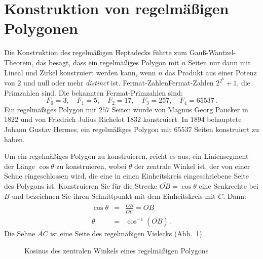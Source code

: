 \section{Konstruktion von regelmäßigen Polygonen}\label{s.hept-regular}

Die Konstruktion des regelmäßigen Heptadecks führte zum Gauß-Wantzel-Theorem, das besagt, dass ein regelmäßiges Polygon mit $n$ Seiten nur dann mit Lineal und Zirkel konstruiert werden kann, wenn $n$ das Produkt aus einer Potenz von $2$ und null oder mehr \emph{distinct} ist. Fermat-Zahlen{Fermat-Zahlen} $2^{2^k}+1$, die Primzahlen sind. Die bekannten Fermat-Primzahlen sind:
\[
F_0=3,\quad F_1=5,\quad F_2=17,\quad F_3=257,\quad F_4=65537\,.
\]
Ein regelmäßiges Polygon mit $257$ Seiten wurde von Magnus Georg Paucker in $1822$ und von Friedrich Julius Richelot $1832$ konstruiert. In $1894$ behauptete Johann Gustav Hermes, ein regelmäßiges Polygon mit $65537$ Seiten konstruiert zu haben.

Um ein regelmäßiges Polygon zu konstruieren, reicht es aus, ein Liniensegment der Länge $\cos \theta$ zu konstruieren, wobei $\theta$ der zentrale Winkel ist, der von einer Sehne eingeschlossen wird, die eine in einen Einheitskreis eingeschriebene Seite des Polygons ist. Konstruieren Sie für die Strecke $\overline{OB}=\cos\theta$ eine Senkrechte bei $B$ und bezeichnen Sie ihren Schnittpunkt mit dem Einheitskreis mit $C$. Dann:
\begin{eqnarray*}
\cos \theta&=&\displaystyle\frac{\overline{OB}}{\overline{OC}}=\overline{OB}\\
\theta &=& \cos^{-1} (\overline{OB})\,.
\end{eqnarray*}
Die Sehne $\overline{AC}$ ist eine Seite des regelmäßigen Vielecks (Abb.~\ref{f.hept-central1}).
\begin{figure}[b]
\begin{center}
\end{center}
\caption{Kosinus des zentralen Winkels eines regelmäßigen Polygons}\label{f.hept-central1}
\end{figure}

